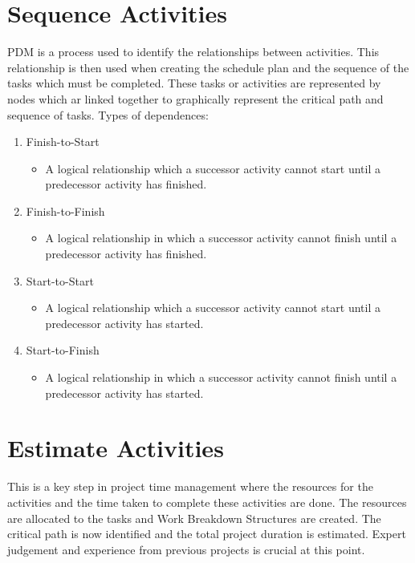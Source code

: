 \section{Sequence Activities}

PDM is a process used to identify the relationships between activities. This relationship is then used when creating the schedule plan and the sequence of the tasks which must be completed. These tasks or activities are represented by nodes which ar linked together to graphically represent the critical path and sequence of tasks.
Types of dependences:
\begin{enumerate}
\item Finish-to-Start
\begin{itemize}
\item A logical relationship which a successor activity cannot start until a predecessor activity has finished.
\end{itemize}
\item Finish-to-Finish
\begin{itemize}
\item A logical relationship in which a successor activity cannot finish until a predecessor activity has finished.
\end{itemize}
\item Start-to-Start
\begin{itemize}
\item A logical relationship which a successor activity cannot start until a predecessor activity has started.
\end{itemize}
\item Start-to-Finish
\begin{itemize}
\item A logical relationship in which a successor activity cannot finish until a predecessor activity has started.
\end{itemize}
\end{enumerate}

\section{Estimate Activities}

This is a key step in project time management where the resources for the activities and the time taken to complete these activities are done. The resources are allocated to the tasks and Work Breakdown Structures are created. The critical path is now identified and the total project duration is estimated. Expert judgement and experience from previous projects is crucial at this point.

